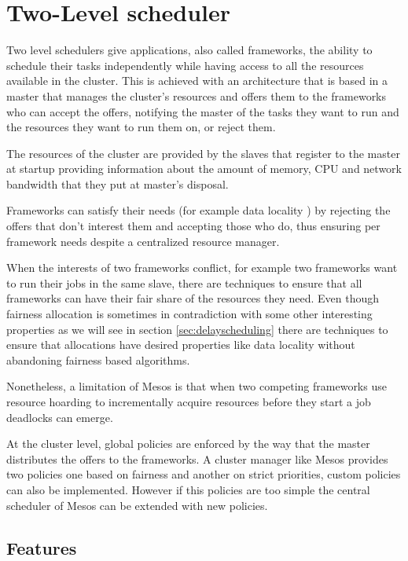 \documentclass{report}                     %
\begin{document}
\chapter{Two-Level scheduler}

\label{sec:mesos}

Two level schedulers give applications, also called
frameworks, the ability to schedule their tasks independently while
having access to all the resources available in the cluster. This
is achieved with an architecture that is based in a master that manages
the cluster's resources and offers them to the frameworks who can accept 
the offers, notifying the master of the tasks they want to run and the
resources they want to run them on, or reject them.

The resources of the cluster are provided by the slaves that register to 
the master at startup providing information about the amount of memory, CPU
and network bandwidth  that they put at master's disposal.  

Frameworks can satisfy their needs (for example data locality
\cite{chung_maximizing_2006} ) by rejecting the offers that don't
interest them and accepting those who do, thus ensuring per framework
needs despite a centralized resource manager.

When the interests of two frameworks conflict, for example two
frameworks want to run their jobs in the same slave, there are
techniques to ensure that all frameworks can have their fair share of
the resources they need. Even though fairness allocation is sometimes
in contradiction with some other interesting properties as we will see
in section \ref{sec:delayscheduling} there are techniques to ensure that allocations
have desired properties like data locality without abandoning fairness
based algorithms. 

Nonetheless, a limitation of Mesos is that when two competing
frameworks use resource hoarding to incrementally acquire resources
before they start a job deadlocks can emerge.

At the cluster level, global policies are enforced by the way that the
master distributes the offers to the frameworks. A cluster manager
like Mesos \cite{Hindman10mesos:a} provides two policies one based on
fairness \cite{AjtaiANRSW1998} and another on strict priorities,
custom policies can also be implemented. However if this policies are
too simple the central scheduler of Mesos can be extended with new
policies.

\section{Features}
\end{document}
